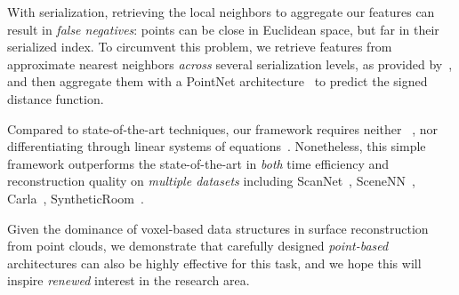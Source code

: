 With serialization, retrieving the local neighbors to aggregate our features can result in \textit{false negatives}: points can be close in Euclidean space, but far in their serialized index.
To circumvent this problem, we retrieve features from approximate nearest neighbors \textit{across} several serialization levels, as provided by~\cite{wu2024point}, and then aggregate them with a PointNet architecture~\cite{PointNet} to predict the signed distance function.

Compared to state-of-the-art techniques, our framework requires neither ~\cite{neuraludf}, nor differentiating through linear systems of equations~\cite{williams2022neural, huang2023neural}.
Nonetheless, this simple framework outperforms the state-of-the-art in \textit{both} time efficiency and reconstruction quality on \textit{multiple datasets} including ScanNet~\cite{dai2017scannet}, SceneNN~\cite{hua2016scenenn}, Carla~\cite{huang2023neural, dosovitskiy2017carla}, SyntheticRoom~\cite{peng2020convoccnet}.

Given the dominance of voxel-based data structures in surface reconstruction from point clouds, we demonstrate that carefully designed \textit{point-based} architectures can also be highly effective for this task, and we hope this will inspire \textit{renewed} interest in the research area.









